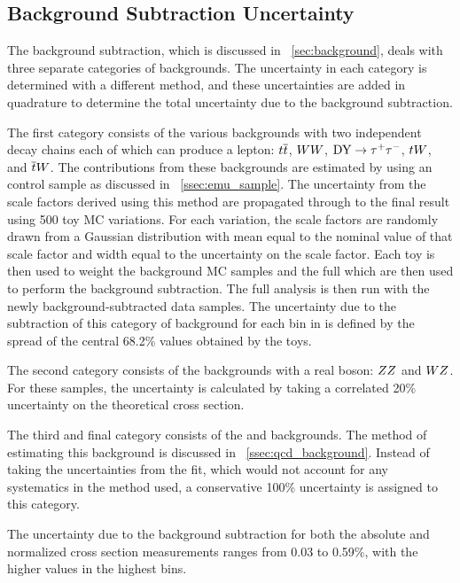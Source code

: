 \subsection{Background Subtraction Uncertainty}
\label{ssec:background_subtraction_uncertainty}

The background subtraction, which is discussed in \SEC~\ref{sec:background},
deals with three separate categories of backgrounds. The uncertainty in
each category is determined with a different method, and these uncertainties 
are added in quadrature to determine the total uncertainty due to the
background subtraction.

The first category consists of the various backgrounds with two independent
decay chains each of which can produce a lepton: $t\overline{t}$, $WW$,
$\text{DY} \to \tau^{+} \tau^{-}$, $tW$, and $\overline{t}W$. The contributions from these backgrounds
are estimated by using an \emu control sample as discussed in
\SEC~\ref{ssec:emu_sample}. The uncertainty from the scale factors derived
using this method are propagated through to the final result using 500 toy MC
variations. For each variation, the scale factors are randomly drawn from a
Gaussian distribution with mean equal to the nominal value of that scale factor
and width equal to the uncertainty on the scale factor. Each toy is then used
to weight the background MC samples and the full which are then used to perform
the background subtraction. The full analysis is then run with the newly
background-subtracted data samples. The uncertainty due to the subtraction of
this category of background for each bin in \phistar is defined by the spread
of the central 68.2\% values obtained by the toys.

The second category consists of the backgrounds with a real \Z boson: $ZZ$
and $WZ$. For these samples, the uncertainty is calculated by taking a
correlated 20\% uncertainty on the theoretical cross section.

The third and final category consists of the \QCDjets and \wjets
backgrounds. The method of estimating this background is discussed in
\SEC~\ref{ssec:qcd_background}. Instead of taking the uncertainties from the
fit, which would not account for any systematics in the method used, a
conservative 100\% uncertainty is assigned to this category.

The uncertainty due to the background subtraction for both the absolute and
normalized cross section measurements ranges from 0.03 to 0.59\%, with the
higher values in the highest \phistar bins.

